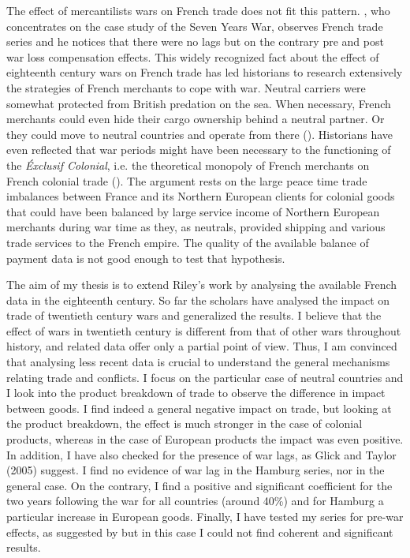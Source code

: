 \documentclass[12pt,a4paper,titlepage,english]{article}
\begin{document}
The effect of mercantilists wars on French trade does not fit this pattern. \cite{riley_seven_1986}, who concentrates on the case study of the Seven Years War, observes French trade series and he notices that there were no lags but on the contrary pre and post war loss compensation effects. This widely recognized fact about the effect of eighteenth century wars on French trade has led historians to research extensively the strategies of French merchants to cope with war. Neutral carriers were somewhat protected from British predation on the sea. When necessary, French merchants could even hide their cargo ownership behind a neutral partner. Or they could move to neutral countries and operate from there (\cite{marzagalli_was_2016}). Historians have even reflected that war periods might have been necessary to the functioning of the \textit{Éxclusif Colonial}, i.e. the theoretical monopoly of French merchants on French colonial trade (\cite{lespagnol_mondialisation_1997, morineau_vraie_1997, marzagalli_was_2016}). The argument rests on the large peace time trade imbalances between France and its Northern European clients for colonial goods that could have been balanced by large service income of Northern European merchants during war time as they, as neutrals, provided shipping and various trade services to the French empire. The quality of the available balance of payment data is not good enough to test that hypothesis.


The aim of my thesis is to extend Riley’s work by analysing the available French data in the eighteenth century. So far the scholars have analysed the impact on trade of twentieth century wars and generalized the results. I believe that the effect of wars in twentieth century is different from that of other wars throughout history, and related data offer only a partial point of view. Thus, I am convinced that analysing less recent data is crucial to understand the general mechanisms relating trade and conflicts. I focus on the particular case of neutral countries and I look into the product breakdown of trade to observe the difference in impact between goods. I find indeed a general negative impact on trade, but looking at the product breakdown, the effect is much stronger in the case of colonial products, whereas in the case of European products the impact was even positive. In addition, I have also checked for the presence of war lags, as Glick and Taylor (2005) suggest. I find no evidence of war lag in the Hamburg series, nor in the general case. On the contrary, I find a positive and significant coefficient for the two years following the war for all countries (around 40\%) and for Hamburg a particular increase in European goods. Finally, I have tested my series for pre-war effects, as suggested by \cite{riley_seven_1986} but in this case I could not find coherent and significant results.  
\end{document}

